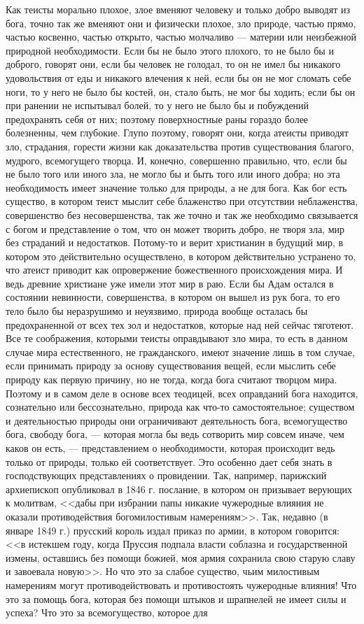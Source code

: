 \documentclass[12pt]{article}
\begin{document}
Как теисты морально плохое, злое вменяют человеку и только добро выводят из бога, точно так же вменяют они и физически плохое, зло природе, частью прямо, частью косвенно, частью открыто, частью молчаливо --- материи или неизбежной природной необходимости. Если бы не было этого плохого, то не было бы и доброго, говорят они, если бы человек не голодал, то он не имел бы никакого удовольствия от еды и никакого влечения к ней, если бы он не мог сломать себе ноги, то у него не было бы костей, он, стало быть, не мог бы ходить; если бы он при ранении не испытывал болей, то у него не было бы и побуждений предохранять себя от них; поэтому поверхностные раны гораздо более болезненны, чем глубокие. Глупо поэтому, говорят они, когда атеисты приводят зло, страдания, горести жизни как доказательства против существования благого, мудрого, всемогущего творца. И, конечно, совершенно правильно, что, если бы не было того или иного зла, не могло бы и быть того или иного добра; но эта необходимость имеет значение только для природы, а не для бога. Как бог есть существо, в котором теист мыслит себе блаженство при отсутствии неблаженства, совершенство без несовершенства, так же точно и так же необходимо связывается с богом и представление о том, что он может творить добро, не творя зла, мир без страданий и недостатков. Потому-то и верит христианин в будущий мир, в котором это действительно осуществлено, в котором действительно устранено то, что атеист приводит как опровержение божественного происхождения мира. И ведь древние христиане уже имели этот мир в раю. Если бы Адам остался в состоянии невинности, совершенства, в котором он вышел из рук бога, то его тело было бы неразрушимо и неуязвимо, природа вообще осталась бы предохраненной от всех тех зол и недостатков, которые над ней сейчас тяготеют. Все те соображения, которыми теисты оправдывают зло мира, то есть в данном случае мира естественного, не гражданского, имеют значение лишь в том случае, если принимать природу за основу существования вещей, если мыслить себе природу как первую причину, но не тогда, когда бога считают творцом мира. Поэтому и в самом деле в основе всех теодицей, всех оправданий бога находится, сознательно или бессознательно, природа как что-то самостоятельное; существом и деятельностью природы они ограничивают деятельность бога, всемогущество бога, свободу бога, --- которая могла бы ведь сотворить мир совсем иначе, чем каков он есть, --- представлением о необходимости, которая происходит ведь только от природы, только ей соответствует. Это особенно дает себя знать в господствующих представлениях о провидении. Так, например, парижский архиепископ опубликовал в 1846 г. послание, в котором он призывает верующих к молитвам, <<дабы при избрании папы никакие чужеродные влияния не оказали противодействия богомилостивым намерениям>>. Так, недавно (в январе 1849 г.) прусский король издал приказ по армии, в котором говорится: <<в истекшем году, когда Пруссия подпала власти соблазна и государственной измены, оставшись без помощи божией, моя армия сохранила свою старую славу и завоевала новую>>. Но что это за слабое существо, чьим милостивым намерениям могут противодействовать и противостоять чужеродные влияния! Что это за помощь бога, которая без помощи штыков и шрапнелей не имеет силы и успеха? Что это за всемогущество, которое для 
\end{document}
